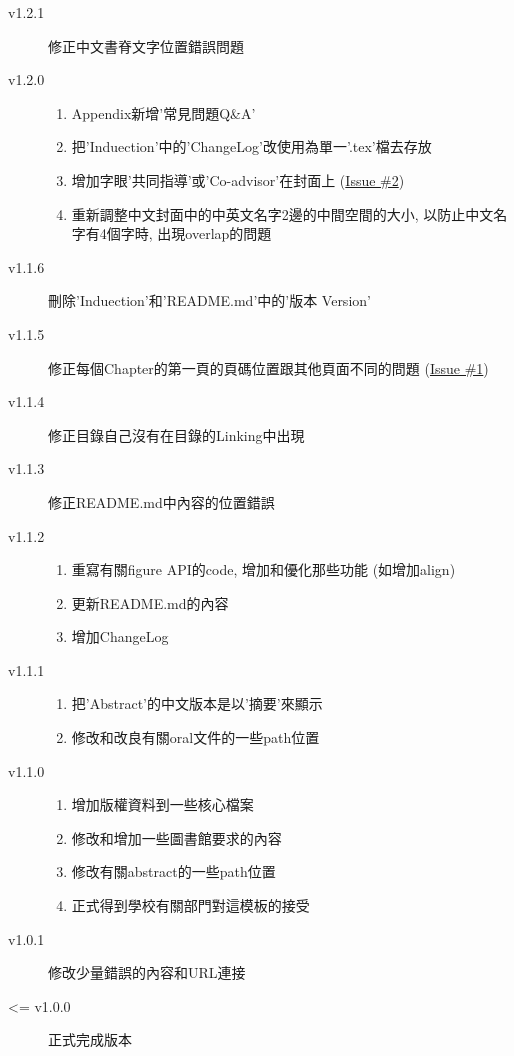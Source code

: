 \begin{description}
  \item[v1.2.1] 修正中文書脊文字位置錯誤問題

  \item[v1.2.0] \hfill
    \begin{enumerate}
      \item Appendix新增'常見問題Q\&A'
      \item 把'Induection'中的'ChangeLog'改使用為單一'.tex'檔去存放
      \item 增加字眼'共同指導'或'Co-advisor'在封面上 (\href{https://github.com/wengan-li/ncku-thesis-template-latex/issues/2}{Issue \#2})
      \item 重新調整中文封面中的中英文名字2邊的中間空間的大小, 以防止中文名字有4個字時, 出現overlap的問題
    \end{enumerate}

  \item[v1.1.6] 刪除'Induection'和'README.md'中的'版本 Version'

  \item[v1.1.5] 修正每個Chapter的第一頁的頁碼位置跟其他頁面不同的問題 (\href{https://github.com/wengan-li/ncku-thesis-template-latex/issues/1}{Issue \#1})

  \item[v1.1.4] 修正目錄自己沒有在目錄的Linking中出現

  \item[v1.1.3] 修正README.md中內容的位置錯誤

  \item[v1.1.2] \hfill
    \begin{enumerate}
      \item 重寫有關figure API的code, 增加和優化那些功能 (如增加align)
      \item 更新README.md的內容
      \item 增加ChangeLog
    \end{enumerate}

  \item[v1.1.1] \hfill
    \begin{enumerate}
      \item 把'Abstract'的中文版本是以'摘要'來顯示
      \item 修改和改良有關oral文件的一些path位置
    \end{enumerate}

  \item[v1.1.0] \hfill
    \begin{enumerate}
      \item 增加版權資料到一些核心檔案
      \item 修改和增加一些圖書館要求的內容
      \item 修改有關abstract的一些path位置
      \item 正式得到學校有關部門對這模板的接受
    \end{enumerate}

  \item[v1.0.1] 修改少量錯誤的內容和URL連接

  \item[<= v1.0.0] 正式完成版本
\end{description}

